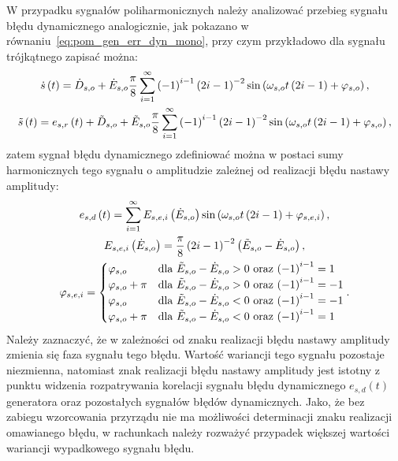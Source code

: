 W przypadku sygnałów poliharmonicznych należy analizować przebieg sygnału błędu dynamicznego analogicznie, jak pokazano w równaniu~\eqref{eq:pom_gen_err_dyn_mono}, przy czym przykładowo dla sygnału trójkątnego zapisać można:
\begin{gather}
\dot{s} \left(t\right) = \dot{D}_{s,o} + \dot{E}_{s,o} \frac{\pi}{8} \sum _{i=1} ^{\infty} \left(-1\right)^{i-1} \left(2i - 1\right)^{-2} \sin \left(\omega_{s,o} t \left(2i - 1\right) + \varphi_{s,o}\right) \label{eq:pom_gen_triangle_ideal}, \\
\tilde{s} \left(t\right) = e_{s,r} \left(t\right) + \tilde{D}_{s,o} + \tilde{E}_{s,o} \frac{\pi}{8} \sum _{i=1} ^{\infty} \left(-1\right)^{i-1} \left(2i - 1\right)^{-2} \sin \left(\omega_{s,o} t \left(2i - 1\right) + \varphi_{s,o}\right) \label{eq:pom_gen_triangle_real},
\end{gather}
zatem sygnał błędu dynamicznego zdefiniować można w postaci sumy harmonicznych tego sygnału o amplitudzie zależnej od realizacji błędu nastawy amplitudy:
\begin{gather}
e_{s,d} \emb{t} = \sum _{i=1} ^{\infty} E_{s,e,i} \emb{\dot{E}_{s,o}} \sin \emb{\omega_{s,o} t \emb{2i - 1} + \varphi_{s,e,i}} \label{eq:pom_gen_err_dyn_triangle}, \\
E_{s,e,i} \emb{\dot{E}_{s,o}} = \frac{\pi}{8} \emb{2i - 1}^{-2} \emb{\tilde{E}_{s,o} - \dot{E}_{s,o}} \label{eq:pom_gen_err_amp_triangle}, \\
\varphi_{s,e,i} =
\begin{cases}
\varphi_{s,o}       & $dla $ \tilde{E}_{s,o} - \dot{E}_{s,o} > 0 $ oraz $ \emb{-1}^{i-1} =  1 \\
\varphi_{s,o} + \pi & $dla $ \tilde{E}_{s,o} - \dot{E}_{s,o} > 0 $ oraz $ \emb{-1}^{i-1} = -1 \\
\varphi_{s,o}       & $dla $ \tilde{E}_{s,o} - \dot{E}_{s,o} < 0 $ oraz $ \emb{-1}^{i-1} = -1 \\
\varphi_{s,o} + \pi & $dla $ \tilde{E}_{s,o} - \dot{E}_{s,o} < 0 $ oraz $ \emb{-1}^{i-1} =  1
\end{cases}
\label{eq:pom_gen_err_phi_triangle}.
\end{gather}
Należy zaznaczyć, że w zależności od znaku realizacji błędu nastawy amplitudy zmienia się faza sygnału tego błędu. Wartość wariancji tego sygnału pozostaje niezmienna, natomiast znak realizacji błędu nastawy amplitudy jest istotny z punktu widzenia rozpatrywania korelacji sygnału błędu dynamicznego $e_{s,d}(t)$ generatora oraz pozostałych sygnałów błędów dynamicznych. Jako, że bez zabiegu wzorcowania przyrządu nie ma możliwości determinacji znaku realizacji omawianego błędu, w rachunkach należy rozważyć przypadek większej wartości wariancji wypadkowego sygnału błędu.

